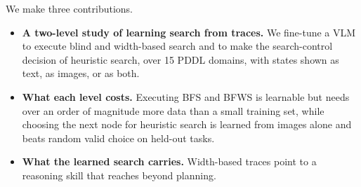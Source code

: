 We make three contributions.
\begin{itemize}[leftmargin=*,itemsep=1pt,parsep=1pt,topsep=2pt]
    \item \textbf{A two-level study of learning search from traces.} We fine-tune a VLM to execute blind and width-based search and to make the search-control decision of heuristic search, over 15 PDDL domains, with states shown as text, as images, or as both.
    \item \textbf{What each level costs.} Executing BFS and BFWS is learnable but needs over an order of magnitude more data than a small training set, while choosing the next node for heuristic search is learned from images alone and beats random valid choice on held-out tasks.
    \item \textbf{What the learned search carries.} Width-based traces point to a reasoning skill that reaches beyond planning.
\end{itemize}
